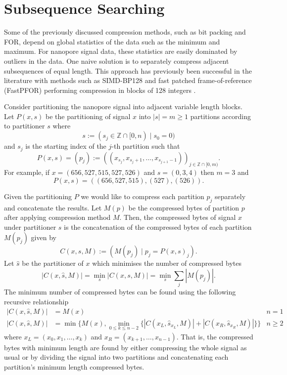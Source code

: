 \section{Subsequence Searching}
Some of the previously discussed compression methods, such as bit packing and FOR, depend on global statistics of the data such as the minimum and maximum.
For nanopore signal data, these statistics are easily dominated by outliers in the data.
One naive solution is to separately compress adjacent subsequences of equal length.
This approach has previously been successful in the literature with methods such as SIMD-BP128 and fast patched frame-of-reference (FastPFOR) performing compression in blocks of 128 integers \cite{lemire-simd}.


Consider partitioning the nanopore signal into adjacent variable length blocks.
Let $P(x,s)$ be the partitioning of signal $x$ into $|s|=m\ge 1$ partitions according to partitioner $s$ where
\[ s := (s_j \in \mathbb{Z}\cap [0, n) \mid s_0 = 0)\]
and $s_j$ is the starting index of the $j$-th partition such that
\[ P(x,s) = (p_j) := ((x_{s_j},x_{s_j+1},\dots,x_{s_{j+1}-1}))_{j\in\mathbb{Z}\cap[0,m)}.\]
For example, if $x=(656,527,515,527,526)$ and $s = (0,3,4)$ then $m=3$ and
\[P(x,s)=((656,527,515),(527),(526)).\]

Given the partitioning $P$ we would like to compress each partition $p_j$ separately and concatenate the results.
Let $M(p)$ be the compressed bytes of partition $p$ after applying compression method $M$.
Then, the compressed bytes of signal $x$ under partitioner $s$ is the concatenation of the compressed bytes of each partition $M(p_j)$ given by
\[ C(x,s,M) := (M(p_j)\mid p_j=P(x,s)_j). \]
Let $\hat s$ be the partitioner of $x$ which minimises the number of compressed bytes
\[ |C(x,\hat s,M)| = \min_s |C(x,s,M)| = \min_s \sum_j|M(p_j)|. \]
The minimum number of compressed bytes can be found using the following recursive relationship
\begin{align*}
	|C(x,\hat s,M)| &= M(x) & n = 1\\
	|C(x,\hat s,M)| &= \min\{M(x),\min_{0\le k\le n-2}\{|C(x_L,\hat s_{x_L},M)| + |C(x_R,\hat s_{x_R},M)|\}\} & n\ge 2
\end{align*}
where $x_L=(x_0,x_1,\dots,x_k)$ and $x_R=(x_{k+1},\dots,x_{n-1})$.
That is, the compressed bytes with minimum length are found by either compressing the whole signal as usual or by dividing the signal into two partitions and concatenating each partition's minimum length compressed bytes.

